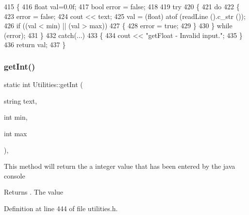\begin{DoxyCode}
415     \{
416         \textcolor{keywordtype}{float} val=0.0f;
417         \textcolor{keywordtype}{bool} error = \textcolor{keyword}{false};
418         
419         \textcolor{keywordflow}{try} 
420         \{
421             \textcolor{keywordflow}{do} 
422             \{
423                 error = \textcolor{keyword}{false};
424                 cout << text;
425                 val = (float) atof (readLine ().c\_str ());
426                 \textcolor{keywordflow}{if} ((val < min) || (val > max)) 
427                 \{
428                     error = \textcolor{keyword}{true};
429                 \}
430             \} \textcolor{keywordflow}{while} (error);
431         \}
432         \textcolor{keywordflow}{catch}(...) 
433         \{
434             cout << \textcolor{stringliteral}{"getFloat - Invalid input."};
435         \}
436         \textcolor{keywordflow}{return} val;
437     \}
\end{DoxyCode}
\mbox{\label{class_utilities_a9f5959c51661e1ec06438d787ffe243a_a9f5959c51661e1ec06438d787ffe243a}} 
\subsubsection{\texorpdfstring{get\+Int()}{getInt()}}
{\footnotesize\ttfamily static int Utilities\+::get\+Int (\begin{DoxyParamCaption}\item[{string}]{text,  }\item[{int}]{min,  }\item[{int}]{max }\end{DoxyParamCaption})\hspace{0.3cm}{\ttfamily [inline]}, {\ttfamily [static]}}

This method will return the a integer value that has been entered by the java console \begin{DoxyReturn}{Returns}
. The value 
\end{DoxyReturn}


Definition at line 444 of file utilities.\+h.


